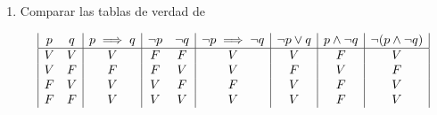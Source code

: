 \documentclass[../practica.root.tex]{subfiles}
\begin{document}
\begin{enumerate}
    \item Comparar las tablas de verdad de

          \[
              \begin{array}{|c c|c|c c|c|c|c|c|}
                  p & q & p\implies q & \neg p & \neg q & \neg p \implies \neg q & \neg p \lor q & p \land \neg q & \neg (p \land \neg q) \\ \hline
                  V & V & V           & F      & F      & V                      & V             & F              & V                     \\
                  V & F & F           & F      & V      & V                      & F             & V              & F                     \\
                  F & V & V           & V      & F      & F                      & V             & F              & V                     \\
                  F & F & V           & V      & V      & V                      & V             & F              & V
              \end{array}
          \]


\end{enumerate}
\end{document}
